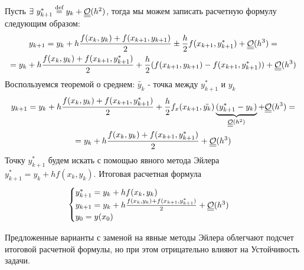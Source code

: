 Пусть $\exists\ y_{k+1}^*\stackrel{\text{def}}{=} y_k+\underline{\underline{\mathcal{O}}}(h^2)$, тогда
мы можем записать расчетную формулу следующим образом:
\begin{multline*}
  y_{k+1}=y_k+h\frac{f(x_k,y_k)+f(x_{k+1},y_{k+1})}{2}\pm\frac{h}{2}f(x_{k+1},y_{k+1}^*)+\underline{\underline{\mathcal{O}}}(h^3)= \\
  = y_k+h\frac{f(x_k,y_k)+f(x_{k+1},y_{k+1}^*)}{2}+\frac{h}{2}(f(x_{k+1},y_{k+1})-f(x_{k+1},y_{k+1}^*))+\underline{\underline{\mathcal{O}}}(h^3)
\end{multline*}
Воспользуемся теоремой о среднем: $\tilde{y_k}$ - точка между $y_{k+1}^*$ и $y_k$
\begin{multline*}
  y_{k+1}=y_k+h\frac{f(x_k,y_k)+f(x_{k+1},y_{k+1}^*)}{2}+\frac{h}{2}f_x(x_{k+1},\tilde{y_k})\underbrace{(y_{k+1}^*-y_k)}_{\underline{\underline{\mathcal{O}}}(h^2)}+\underline{\underline{\mathcal{O}}}(h^3)= \\
  =y_k+h\frac{f(x_k,y_k)+f(x_{k+1},y_{k+1}^*)}{2}+\underline{\underline{\mathcal{O}}}(h^3)
\end{multline*}
Точку $y_{k+1}^*$ будем искать с помощью явного метода Эйлера $y_{k+1}^*=y_k+hf(x_k,y_k)$.
Итоговая расчетная формула
\[\begin{cases}
    y_{k+1}^*=y_k+hf(x_k,y_k)                                         \\
    y_{k+1}=y_k+h\frac{f(x_k,y_k)+f(x_{k+1},y_{k+1}^*)}{2}+\underline{\underline{\mathcal{O}}}(h^3) \\
    y_0=y(x_0)
  \end{cases}\]
\begin{remark}
  Предложенные варианты с заменой на явные методы Эйлера облегчают
  подсчет итоговой расчетной формулы, но при этом отрицательно влияют на Устойчивость
  задачи.
\end{remark}
